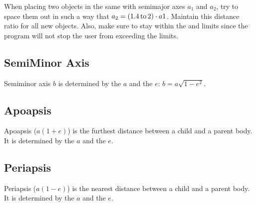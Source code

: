 \documentclass[letterpaper,10pt,english]{sphinxmanual}
\begin{document}
\sphinxAtStartPar
When placing two objects in the same {\hyperref[\detokenize{celestial_systems/celestial_systems:id1}]{}}
with semi\sphinxhyphen{}major axes \(a_1\) and \(a_2\),
try to space them out in such a way that \(a_2 = (1.4 \, {\rm to} \, 2) \cdot a1\).
Maintain this distance ratio for all new objects.
Also, make sure to stay within the {\hyperref[\detokenize{quantities/orbital/semi_major_axis_minimum_limit:id1}]{}}
and {\hyperref[\detokenize{quantities/orbital/semi_major_axis_maximum_limit:id1}]{}} limits since
the program will not stop the user from exceeding the limits.


\subsection{Semi\sphinxhyphen{}Minor Axis}
\label{\detokenize{quantities/orbital/semi_minor_axis:semi-minor-axis}}\label{\detokenize{quantities/orbital/semi_minor_axis::doc}}\label{\detokenize{quantities/orbital/semi_minor_axis:id1}}
\sphinxAtStartPar
Semi\sphinxhyphen{}minor axis \(b\) is determined by the {\hyperref[\detokenize{quantities/orbital/semi_major_axis:id1}]{}} \(a\) and the
{\hyperref[\detokenize{quantities/orbital/eccentricity:id1}]{}} \(e\): \(b = a \sqrt{1 - e^2}\).


\subsection{Apoapsis}
\label{\detokenize{quantities/orbital/apoapsis:apoapsis}}\label{\detokenize{quantities/orbital/apoapsis::doc}}\label{\detokenize{quantities/orbital/apoapsis:id1}}
\sphinxAtStartPar
Apoapsis (\(a (1 + e)\)) is the furthest distance between a child and a parent body.
It is determined by the {\hyperref[\detokenize{quantities/orbital/semi_major_axis:id1}]{}} \(a\) and the
{\hyperref[\detokenize{quantities/orbital/eccentricity:id1}]{}} \(e\).


\subsection{Periapsis}
\label{\detokenize{quantities/orbital/periapsis:periapsis}}\label{\detokenize{quantities/orbital/periapsis::doc}}\label{\detokenize{quantities/orbital/periapsis:id1}}
\sphinxAtStartPar
Periapsis (\(a (1 - e)\)) is the nearest distance between a child and a parent body.
It is determined by the {\hyperref[\detokenize{quantities/orbital/semi_major_axis:id1}]{}} \(a\) and the
{\hyperref[\detokenize{quantities/orbital/eccentricity:id1}]{}} \(e\).
\end{document}
